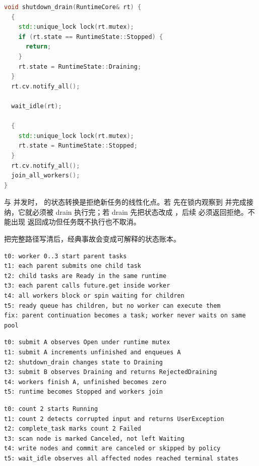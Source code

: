 \begin{lstlisting}[language=C++,caption={shutdown drain 的语义伪代码}]
void shutdown_drain(RuntimeCore& rt) {
  {
    std::unique_lock lock(rt.mutex);
    if (rt.state == RuntimeState::Stopped) {
      return;
    }
    rt.state = RuntimeState::Draining;
  }
  rt.cv.notify_all();

  wait_idle(rt);

  {
    std::unique_lock lock(rt.mutex);
    rt.state = RuntimeState::Stopped;
  }
  rt.cv.notify_all();
  join_all_workers();
}
\end{lstlisting}

与  并发时， 的状态转换是拒绝新任务的线性化点。若  先在锁内观察到  并完成接纳，它就必须被 drain 执行完；若 drain 先把状态改成 ，后续  必须返回拒绝。不能出现  返回成功但任务既不执行也不取消。

把完整路径写清后，经典事故会变成可解释的状态账本。

\begin{lstlisting}[numbers=none,caption={future 饥饿的事件序列}]
t0: worker 0..3 start parent tasks
t1: each parent submits one child task
t2: child tasks are Ready in the same runtime
t3: each parent calls future.get inside worker
t4: all workers block or spin waiting for children
t5: ready queue has children, but no worker can execute them
fix: parent continuation becomes a task; worker never waits on same pool
\end{lstlisting}

\begin{lstlisting}[numbers=none,caption={关闭竞态的事件序列}]
t0: submit A observes Open under runtime mutex
t1: submit A increments unfinished and enqueues A
t2: shutdown_drain changes state to Draining
t3: submit B observes Draining and returns RejectedDraining
t4: workers finish A, unfinished becomes zero
t5: runtime becomes Stopped and workers join
\end{lstlisting}

\begin{lstlisting}[numbers=none,caption={前驱失败传播的事件序列}]
t0: count 2 starts Running
t1: count 2 detects corrupted input and returns UserException
t2: complete_task marks count 2 Failed
t3: scan node is marked Canceled, not left Waiting
t4: write nodes and commit are canceled or skipped by policy
t5: wait_idle observes all affected nodes reached terminal states
\end{lstlisting}

